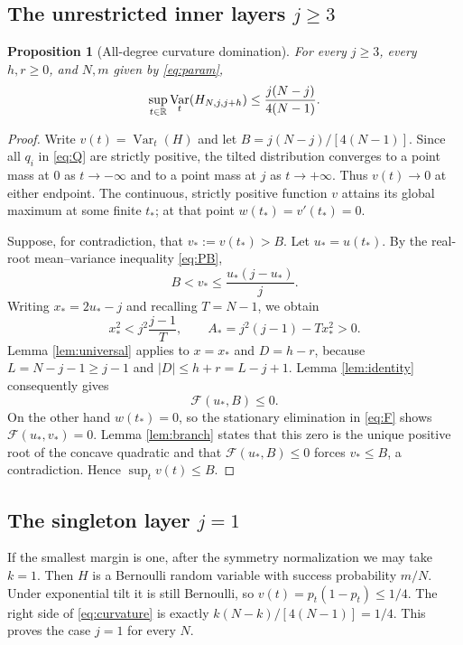 \documentclass[11pt,a4paper]{article}
\newtheorem{proposition}[theorem]{Proposition}
\DeclareMathOperator{\Var}{Var}\DeclareMathOperator{\Cov}{Cov}\DeclareMathOperator{\Hyp}{Hyp}\DeclareMathOperator{\Bern}{Bern}\DeclareMathOperator{\supp}{supp}\DeclareMathOperator{\artanh}{artanh}
\begin{document}
\subsection{The unrestricted inner layers \texorpdfstring{$j\ge3$}{j >= 3}}
\begin{proposition}[All-degree curvature domination]\label{prop:allinner}
For every $j\ge3$, every $h,r\ge0$, and $N,m$ given by \eqref{eq:param},
\begin{equation}\label{eq:allinner}
 \sup_{t\in\R}\Var_t(H_{N,j,j+h})\le\frac{j(N-j)}{4(N-1)}.
\end{equation}
\end{proposition}
\begin{proof}
Write $v(t)=\Var_t(H)$ and let $B=j(N-j)/[4(N-1)]$. Since all $q_i$ in \eqref{eq:Q} are strictly positive, the tilted distribution converges to a point mass at $0$ as $t\to-\infty$ and to a point mass at $j$ as $t\to+\infty$. Thus $v(t)\to0$ at either endpoint. The continuous, strictly positive function $v$ attains its global maximum at some finite $t_*$; at that point $w(t_*)=v'(t_*)=0$.

Suppose, for contradiction, that $v_*:=v(t_*)>B$. Let $u_*=u(t_*)$. By the real-root mean--variance inequality \eqref{eq:PB},
\[
 B<v_*\le\frac{u_*(j-u_*)}{j}.
\]
Writing $x_*=2u_*-j$ and recalling $T=N-1$, we obtain
\[
 x_*^2<j^2\frac{j-1}{T},\qquad
 A_*=j^2(j-1)-Tx_*^2>0.
\]
Lemma \ref{lem:universal} applies to $x=x_*$ and $D=h-r$, because $L=N-j-1\ge j-1$ and $|D|\le h+r=L-j+1$. Lemma \ref{lem:identity} consequently gives
\[
 \mathcal F(u_*,B)\le0.
\]
On the other hand $w(t_*)=0$, so the stationary elimination in \eqref{eq:F} shows $\mathcal F(u_*,v_*)=0$. Lemma \ref{lem:branch} states that this zero is the unique positive root of the concave quadratic and that $\mathcal F(u_*,B)\le0$ forces $v_*\le B$, a contradiction. Hence $\sup_t v(t)\le B$.
\end{proof}

\subsection{The singleton layer \texorpdfstring{$j=1$}{j = 1}}
If the smallest margin is one, after the symmetry normalization we may take $k=1$. Then $H$ is a Bernoulli random variable with success probability $m/N$. Under exponential tilt it is still Bernoulli, so $v(t)=p_t(1-p_t)\le1/4$. The right side of \eqref{eq:curvature} is exactly $k(N-k)/[4(N-1)]=1/4$. This proves the case $j=1$ for every $N$.
\end{document}
